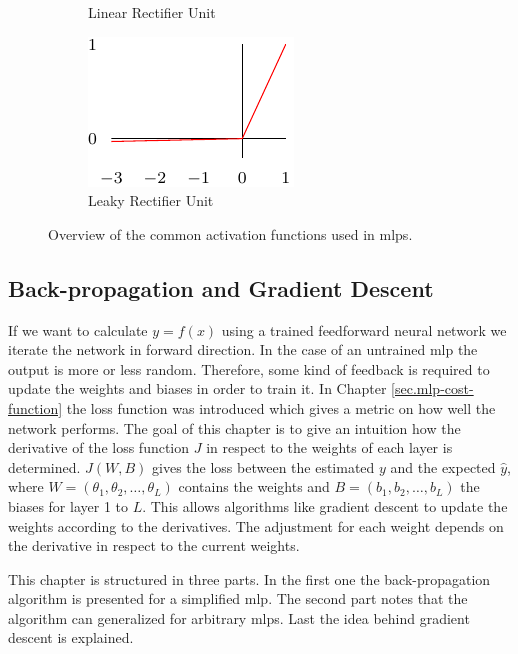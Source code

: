 \begin{figure}
\begin{subfigure}[t]{0.25\textwidth}
		\caption{Linear Rectifier Unit}
		\label{fig.mlp-activation-functions.relu}
	\end{subfigure}%
	\begin{subfigure}[t]{0.25\textwidth}
		\centering
		\includegraphics{figure/leaky_relu.pdf}
		\caption{Leaky Rectifier Unit}
		\label{fig.mlp-activation-functions.leaky-relu}
	\end{subfigure}%
	\caption{Overview of the common activation functions used in \glspl{mlp}.}
	\label{fig.mlp-activation-functions}
\end{figure}


\subsection{Back-propagation and Gradient Descent}\label{sec.mlp-backpropagation}

If we want to calculate $y=f(x)$ using a trained feedforward neural network we iterate the network in forward direction. In the case of an untrained \gls{mlp} the output is more or less random. Therefore, some kind of feedback is required to update the weights and biases in order to train it. In Chapter \ref{sec.mlp-cost-function} the loss function was introduced which gives a metric on how well the network performs. The goal of this chapter is to give an intuition how the derivative of the loss function $J$ in respect to the weights of each layer is determined.
$J(W, B)$ gives the loss between the estimated $y$ and the expected $\hat{y}$, where $W=(\theta_1, \theta_2, \ldots, \theta_L)$ contains the weights and $B=(b_1, b_2, \ldots, b_L)$ the biases for layer 1 to $L$.
This allows algorithms like gradient descent to update the weights according to the derivatives. The adjustment for each weight depends on the derivative in respect to the current weights. \cite[p.~198]{Goodfellow2016}

This chapter is structured in three parts. In the first one the back-propagation algorithm is presented for a simplified \gls{mlp}. The second part notes that the algorithm can generalized for arbitrary \glspl{mlp}. Last the idea behind gradient descent is explained.

